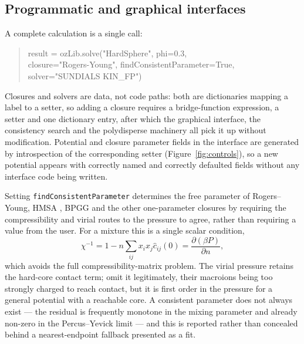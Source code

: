\documentclass[11pt,a4paper]{article}
\newcommand{\code}[1]{\texttt{#1}}
\begin{document}
\subsection{Programmatic and graphical interfaces}

A complete calculation is a single call:
\begin{quote}\small\ttfamily
result = ozLib.solve("HardSphere", phi=0.3,\\
\hspace*{2em}closure="Rogers-Young", findConsistentParameter=True,\\
\hspace*{2em}solver="SUNDIALS KIN\_FP")
\end{quote}
Closures and solvers are data, not code paths: both are dictionaries mapping a
label to a setter, so adding a closure requires a bridge-function expression, a
setter and one dictionary entry, after which the graphical interface, the
consistency search and the polydisperse machinery all pick it up without
modification. Potential and closure parameter fields in the interface are
generated by introspection of the corresponding setter
(Figure~\ref{fig:controls}), so a new potential appears with correctly named
and correctly defaulted fields without any interface code being written.

Setting \code{findConsistentParameter} determines the free parameter of
Rogers--Young, HMSA \citep{ZerahHansen1986}, BPGG and the other one-parameter closures by requiring the
compressibility and virial routes to the pressure to agree, rather than
requiring a value from the user. For a mixture this is a single scalar
condition,
\begin{equation}
\chi^{-1} = 1 - n\sum_{ij} x_i x_j \hat c_{ij}(0)
= \frac{\partial(\beta P)}{\partial n},
\label{eq:consistency}
\end{equation}
which avoids the full compressibility-matrix problem. The virial pressure
retains the hard-core contact term; \citet{DAguannoKlein1992} omit it legitimately,
their macroions being too strongly charged to reach contact, but it is first
order in the pressure for a general potential with a reachable core. A
consistent parameter does not always exist --- the residual is frequently
monotone in the mixing parameter and already non-zero in the Percus--Yevick
limit --- and this is reported rather than concealed behind a nearest-endpoint
fallback presented as a fit.


\end{document}
